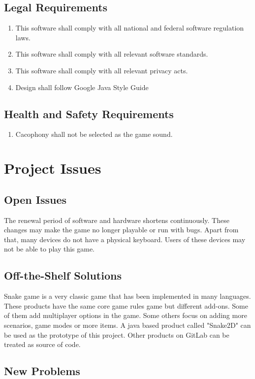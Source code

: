 \documentclass[12pt, titlepage]{article}
\begin{document}
\subsection{Legal Requirements}
\begin{enumerate}[{LR}1. ]
	    \item This software shall comply with all national and federal software regulation laws.
        \item This software shall comply with all relevant software standards.
        \item This software shall comply with all relevant privacy acts.
        \item Design shall follow Google Java Style Guide
\end{enumerate}
\subsection{Health and Safety Requirements}
\begin{enumerate}[{HS}1. ]
	    \item Cacophony shall not be selected as the game sound.
\end{enumerate}


\section{Project Issues}

\subsection{Open Issues}
    The renewal period of software and hardware shortens continuously. These changes may make the game no longer playable or run with bugs. Apart from that, many devices do not have a physical keyboard. Users of these devices may not be able to play this game.
\subsection{Off-the-Shelf Solutions}
    Snake game is a very classic game that has been implemented in many languages. These products have the same core game rules game but different add-ons. Some of them add multiplayer options in the game. Some others focus on adding more scenarios, game modes or more items. A java based product called "Snake2D" can be used as the prototype of this project. Other products on GitLab can be treated as source of code.
\subsection{New Problems}
\end{document}
